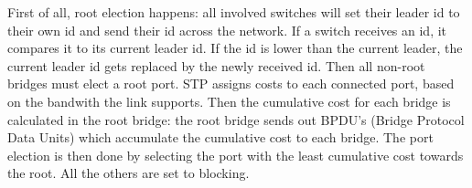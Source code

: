 First of all, root election happens: all involved switches will set their leader id to their own id and send their id across the network. If a switch receives an id, it compares it to its current leader id. If the id is lower than the current leader, the current leader id gets replaced by the newly received id. Then all non-root bridges must elect a root port. STP assigns costs to each connected port, based on the bandwith the link supports. Then the cumulative cost for each bridge is calculated in the root bridge: the root bridge sends out BPDU's (Bridge Protocol Data Units) which accumulate the cumulative cost to each bridge. The port election is then done by selecting the port with the least cumulative cost towards the root. All the others are set to blocking.